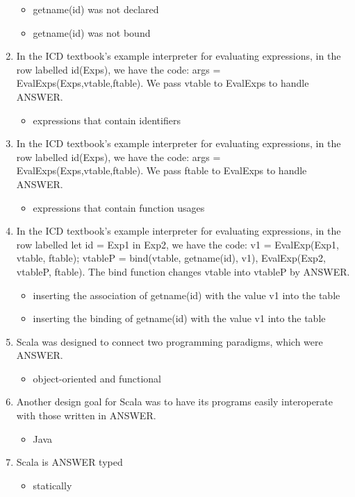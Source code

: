 \documentclass{exam}
\begin{document}
\begin{enumerate}
\begin{itemize}
\item getname(id) was not declared
\item getname(id) was not bound
\end{itemize}
\item In the ICD textbook's example interpreter for evaluating expressions, in the row labelled id(Exps), we have the code: args = EvalExps(Exps,vtable,ftable).  We pass vtable to EvalExps to handle ANSWER.
\begin{itemize}
\item expressions that contain identifiers
\end{itemize}
\item In the ICD textbook's example interpreter for evaluating expressions, in the row labelled id(Exps), we have the code: args = EvalExps(Exps,vtable,ftable).  We pass ftable to EvalExps to handle ANSWER.
\begin{itemize}
\item expressions that contain function usages
\end{itemize}
\item In the ICD textbook's example interpreter for evaluating expressions, in the row labelled let id = Exp1 in Exp2, we have the code: v1 = EvalExp(Exp1, vtable, ftable); vtableP = bind(vtable, getname(id), v1), EvalExp(Exp2, vtableP, ftable).  The bind function changes vtable into vtableP by ANSWER.
\begin{itemize}
\item inserting the association of getname(id) with the value v1 into the table
\item inserting the binding of getname(id) with the value v1 into the table
\end{itemize}
\item Scala was designed to connect two programming paradigms, which were ANSWER.
\begin{itemize}
\item object-oriented and functional
\end{itemize}
\item Another design goal for Scala was to have its programs easily interoperate with those written in ANSWER.
\begin{itemize}
\item Java
\end{itemize}
\item Scala is ANSWER typed
\begin{itemize}
\item statically

\end{itemize}
\end{enumerate}
\end{document}
